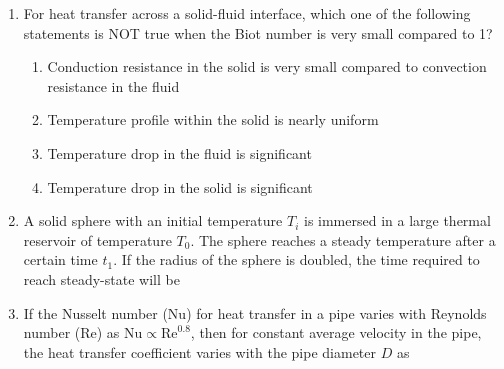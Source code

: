 \documentclass[journal,12pt,onecolumn]{IEEEtran}
\theoremstyle{remark}
\begin{document}
\begin{enumerate}
    \item For heat transfer across a solid-fluid interface, which one of the following statements is NOT true when the Biot number is very small compared to 1?
    \hfill{}
    \begin{enumerate}
        \item Conduction resistance in the solid is very small compared to convection resistance in the fluid
        \item Temperature profile within the solid is nearly uniform
        \item Temperature drop in the fluid is significant
        \item Temperature drop in the solid is significant
    \end{enumerate}

    \item A solid sphere with an initial temperature $T_i$ is immersed in a large thermal reservoir of temperature $T_0$. The sphere reaches a steady temperature after a certain time $t_1$. If the radius of the sphere is doubled, the time required to reach steady-state will be
    \hfill{}
    \begin{enumerate}
    \end{enumerate}

    \item If the Nusselt number (Nu) for heat transfer in a pipe varies with Reynolds number (Re) as $\text{Nu} \propto \text{Re}^{0.8}$, then for constant average velocity in the pipe, the heat transfer coefficient varies with the pipe diameter $D$ as
    \hfill{}
    \begin{enumerate}
    \end{enumerate}


\end{enumerate}
\end{document}
